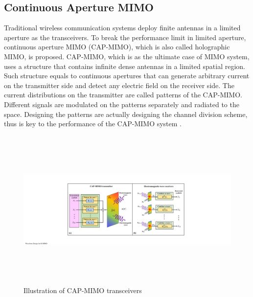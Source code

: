 \documentclass[journal,twocolumn]{IEEEtran}
\begin{document}

\subsection{Continuous Aperture MIMO}
Traditional wireless communication systems deploy finite antennas in a limited aperture as the transceivers. To break the performance limit in limited aperture, continuous aperture MIMO (CAP-MIMO), which is also called holographic MIMO, is proposed. CAP-MIMO, which is as the ultimate case of MIMO system, uses a structure that contains infinite dense antennas in a limited spatial region. Such structure equals to continuous apertures that can generate arbitrary current on the transmitter side and detect any electric field on the receiver side. The current distributions on the transmitter are called patterns of the CAP-MIMO. Different signals are modulated on the patterns separately and radiated to the space. Designing the patterns are actually designing the channel division scheme, thus is key to the performance of the CAP-MIMO system \cite{9839220}.

\begin{figure}
	\centering 
	\includegraphics[height=8cm, width=15cm]{figures/CAPMIMO.pdf} 
	\caption{Illustration of CAP-MIMO transceivers \cite{zhangzijian} }
	\label{fig:CAPMIMO}
\end{figure}
\end{document}
